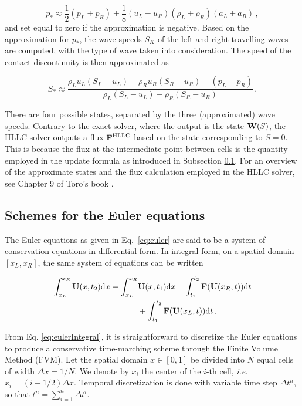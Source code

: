 \documentclass[final,3p,twocolumn,times]{elsarticle}
\begin{document}
\begin{equation}
    p_* \approx \frac{1}{2}(p_L+p_R) 
    +\frac{1}{8}(u_L-u_R)(\rho_L+\rho_R)(a_L+a_R) \,,
    \label{eq:pressureHLLC}
\end{equation}
%
and set equal to zero if the approximation is negative. Based on the
approximation for $p_*$, the wave speeds $S_K$ of the left and right travelling
waves are computed, with the type of wave taken into consideration. The speed
of the contact discontinuity is then approximated as

\begin{equation}
    S_* \approx \frac{\rho_L u_L(S_L-u_L)-\rho_R
    u_R(S_R-u_R)-(p_L-p_R)}{\rho_L(S_L-u_L)-\rho_R(S_R-u_R)} \,.
    \label{eq:speedHLLC}
\end{equation}

There are four possible states, separated by the three (approximated) wave
speeds.  Contrary to the exact solver, where the output is the state ${\bf
W}(S)$, the HLLC solver outputs a flux ${\bf F}^{\rm HLLC}$ based on the state
corresponding to $S=0$. This is because the flux at the intermediate point
between cells is the quantity employed in the update formula as introduced in
Subsection \ref{subsec:eulerschemes}. For an overview of the approximate states
and the flux calculation employed in the HLLC solver, see Chapter 9 of Toro's
book \cite{toro2013riemann}. 

\subsection{Schemes for the Euler equations}
\label{subsec:eulerschemes}

The Euler equations as given in Eq.\ \eqref{eq:euler} are said to be a system
of conservation equations in differential form. In integral form, on a spatial
domain $[x_L, x_R]$, the same system of equations can be written

\begin{align}
    \nonumber
    \int_{x_L}^{x_R} {\bf U}(x,t_2) {\rm d}x = 
    \int_{x_L}^{x_R} &{\bf U}(x,t_1) {\rm d}x 
    -\int_{t_1}^{t_2} {\bf F}({\bf U}(x_R,t)) {\rm d}t \\
    &+ \int_{t_1}^{t_2} {\bf F}({\bf U}(x_L,t)) {\rm d}t \,.
    \label{eq:eulerIntegral}
\end{align}

From Eq. \eqref{eq:eulerIntegral}, it is straightforward to discretize the
Euler equations to produce a conservative time-marching scheme through the
Finite Volume Method (FVM). Let the spatial domain $x \in [0,1]$ be divided
into $N$ equal cells of width $\Delta x = 1/N$.  We denote by $x_i$ the center
of the $i$-th cell, \emph{i.e.~} $x_i = (i+1/2)\Delta x$. 
%
Temporal discretization is done with variable time step $\Delta t^n$, so that
$t^n = \sum_{i=1}^n \Delta t^i$. 
\end{document}
